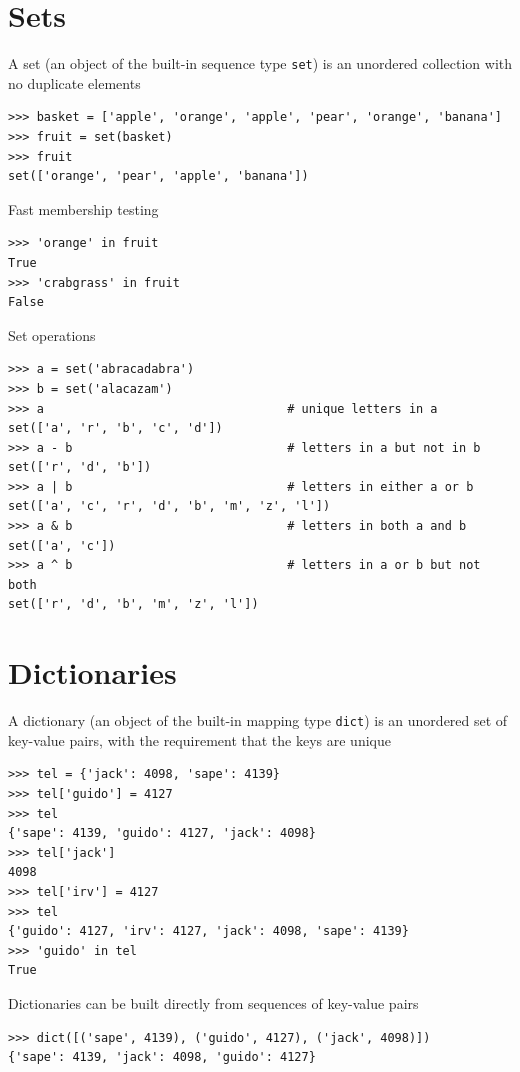 \documentclass[8pt,a4paper,compress]{beamer}
\begin{document}
\section{Sets}
\begin{frame}[fragile]
\pause

A set (an object of the built-in sequence type \lstinline{set}) is an unordered collection with no duplicate elements
\begin{lstlisting}[language={}]
>>> basket = ['apple', 'orange', 'apple', 'pear', 'orange', 'banana']
>>> fruit = set(basket)
>>> fruit
set(['orange', 'pear', 'apple', 'banana'])
\end{lstlisting}

\pause
\bigskip

Fast membership testing
\begin{lstlisting}[language={}]
>>> 'orange' in fruit
True
>>> 'crabgrass' in fruit
False
\end{lstlisting}

\pause
\bigskip

Set operations
\begin{lstlisting}[language={}]
>>> a = set('abracadabra')
>>> b = set('alacazam')
>>> a                                  # unique letters in a
set(['a', 'r', 'b', 'c', 'd'])
>>> a - b                              # letters in a but not in b
set(['r', 'd', 'b'])
>>> a | b                              # letters in either a or b
set(['a', 'c', 'r', 'd', 'b', 'm', 'z', 'l'])
>>> a & b                              # letters in both a and b
set(['a', 'c'])
>>> a ^ b                              # letters in a or b but not both
set(['r', 'd', 'b', 'm', 'z', 'l'])
\end{lstlisting}
\end{frame}

\section{Dictionaries}
\begin{frame}[fragile]
\pause

A dictionary (an object of the built-in mapping type \lstinline{dict}) is an unordered set of key-value pairs, with the requirement that the keys are unique
\begin{lstlisting}[language={}]
>>> tel = {'jack': 4098, 'sape': 4139}
>>> tel['guido'] = 4127
>>> tel
{'sape': 4139, 'guido': 4127, 'jack': 4098}
>>> tel['jack']
4098
>>> tel['irv'] = 4127
>>> tel
{'guido': 4127, 'irv': 4127, 'jack': 4098, 'sape': 4139}
>>> 'guido' in tel
True
\end{lstlisting}

\pause
\bigskip

Dictionaries can be built directly from sequences of key-value pairs
\begin{lstlisting}[language={}]
>>> dict([('sape', 4139), ('guido', 4127), ('jack', 4098)])
{'sape': 4139, 'jack': 4098, 'guido': 4127}
\end{lstlisting}
\end{frame}
\end{document}
